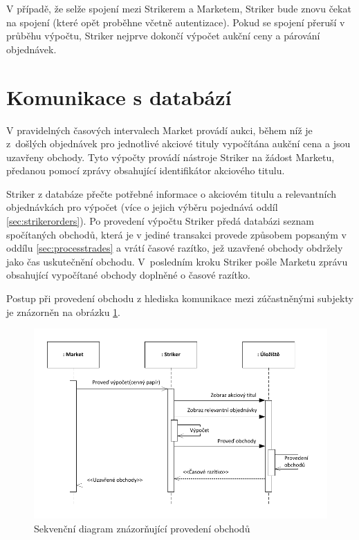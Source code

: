 \documentclass[thesis=M,czech]{FITthesis}[2012/06/26]
\begin{document}
V případě, že selže spojení mezi Strikerem a Marketem, Striker bude znovu čekat na spojení (které opět proběhne včetně 
autentizace). Pokud se spojení přeruší v průběhu výpočtu, Striker nejprve dokončí výpočet aukční ceny a 
párování objednávek.



\section{Komunikace s databází}
\label{sec:dbstrikercom}

V pravidelných časových intervalech Market provádí aukci, během níž je z~došlých objednávek pro jednotlivé akciové tituly vypočítána aukční 
cena a jsou uzavřeny obchody. Tyto výpočty provádí nástroje Striker na žádost Marketu, předanou pomocí zprávy obsahující identifikátor 
akciového titulu. 

Striker z databáze přečte potřebné informace o akciovém titulu a relevantních objednávkách pro výpočet (více o jejich výběru 
pojednává oddíl \ref{sec:strikerorders}). Po provedení výpočtu Striker předá databázi seznam spočítaných obchodů, která je 
v jediné transakci provede způsobem popsaným v oddílu \ref{sec:processtrades} a vrátí časové razítko, jež uzavřené obchody obdržely jako čas 
uskutečnění obchodu. V~posledním kroku Striker pošle Marketu zprávu obsahující vypočítané obchody doplněné o časové razítko.

Postup při provedení obchodu z hlediska komunikace mezi zúčastněnými subjekty je znázorněn na obrázku \ref{fig:seq-process-trades-anal}.

\begin{figure}\centering
	\includegraphics[width=\textwidth]{images/seq-process-trades-anal} 
	\caption[Diagram provedení obchodů]{Sekvenční diagram znázorňující provedení obchodů}\label{fig:seq-process-trades-anal}
\end{figure}
\end{document}
